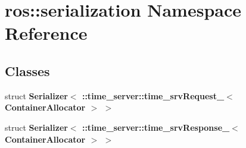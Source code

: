 \section{ros\-:\-:serialization \-Namespace \-Reference}
\label{namespaceros_1_1serialization}
\subsection*{\-Classes}
\begin{DoxyCompactItemize}
\item 
struct {\bf \-Serializer$<$ \-::time\-\_\-server\-::time\-\_\-srv\-Request\-\_\-$<$ Container\-Allocator $>$ $>$}
\item 
struct {\bf \-Serializer$<$ \-::time\-\_\-server\-::time\-\_\-srv\-Response\-\_\-$<$ Container\-Allocator $>$ $>$}
\end{DoxyCompactItemize}
